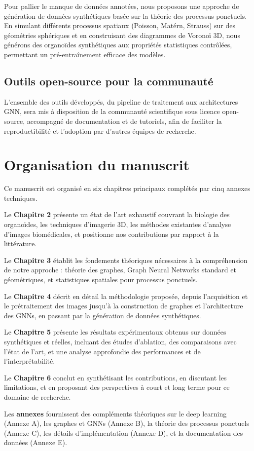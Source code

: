 Pour pallier le manque de données annotées, nous proposons une approche de génération de données synthétiques basée sur la théorie des processus ponctuels. En simulant différents processus spatiaux (Poisson, Matérn, Strauss) sur des géométries sphériques et en construisant des diagrammes de Voronoï 3D, nous générons des organoïdes synthétiques aux propriétés statistiques contrôlées, permettant un pré-entraînement efficace des modèles.

\subsection{Outils open-source pour la communauté}

L'ensemble des outils développés, du pipeline de traitement aux architectures GNN, sera mis à disposition de la communauté scientifique sous licence open-source, accompagné de documentation et de tutoriels, afin de faciliter la reproductibilité et l'adoption par d'autres équipes de recherche.

\section{Organisation du manuscrit}

Ce manuscrit est organisé en six chapitres principaux complétés par cinq annexes techniques.

Le \textbf{Chapitre 2} présente un état de l'art exhaustif couvrant la biologie des organoïdes, les techniques d'imagerie 3D, les méthodes existantes d'analyse d'images biomédicales, et positionne nos contributions par rapport à la littérature.

Le \textbf{Chapitre 3} établit les fondements théoriques nécessaires à la compréhension de notre approche : théorie des graphes, Graph Neural Networks standard et géométriques, et statistiques spatiales pour processus ponctuels.

Le \textbf{Chapitre 4} décrit en détail la méthodologie proposée, depuis l'acquisition et le prétraitement des images jusqu'à la construction de graphes et l'architecture des GNNs, en passant par la génération de données synthétiques.

Le \textbf{Chapitre 5} présente les résultats expérimentaux obtenus sur données synthétiques et réelles, incluant des études d'ablation, des comparaisons avec l'état de l'art, et une analyse approfondie des performances et de l'interprétabilité.

Le \textbf{Chapitre 6} conclut en synthétisant les contributions, en discutant les limitations, et en proposant des perspectives à court et long terme pour ce domaine de recherche.

Les \textbf{annexes} fournissent des compléments théoriques sur le deep learning (Annexe A), les graphes et GNNs (Annexe B), la théorie des processus ponctuels (Annexe C), les détails d'implémentation (Annexe D), et la documentation des données (Annexe E).

